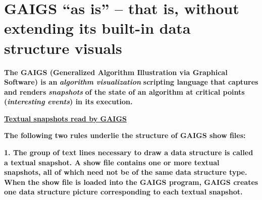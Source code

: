 \documentclass[12pt]{article}
\begin{document}
\section{GAIGS ``as is'' -- that is, without extending its built-in data structure visuals}
\begin{flushleft}
\textbf{{\footnotesize{}The GAIGS (Generalized Algorithm Illustration via Graphical Software) is an }}\textbf{\textit{{\footnotesize{}algorithm visualization }}}\textbf{{\footnotesize{} scripting language that captures and renders }}\textbf{\textit{{\footnotesize{}snapshots}}}\textbf{{\footnotesize{} of the state of an algorithm at critical points (}}\textbf{\textit{{\footnotesize{}interesting events}}}\textbf{{\footnotesize{}) in its execution.  }}
\end{flushleft}

\begin{flushleft}

\end{flushleft}


\begin{flushleft}
\textbf{\uline{{\footnotesize{}Textual snapshots read by GAIGS}}}
\end{flushleft}

\begin{flushleft}

\end{flushleft}

\begin{flushleft}
\textbf{{\footnotesize{}The following two rules underlie the structure of GAIGS show files:}}
\end{flushleft}

\begin{flushleft}
\textbf{{\footnotesize{} }}
\end{flushleft}

\begin{flushleft}
\textbf{{\footnotesize{}1.      The group of text lines necessary to draw a data structure is called a textual snapshot.  A show file contains one or more textual snapshots, all of which need not be of the same data structure type. When the show file is loaded into the GAIGS program, GAIGS creates one data structure picture corresponding to each textual snapshot. }}
\end{flushleft}
\end{document}
